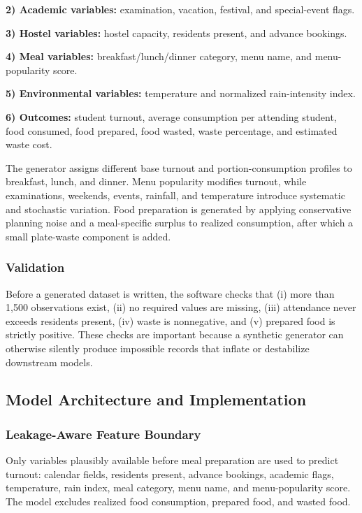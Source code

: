 \documentclass[conference]{IEEEtran}
\begin{document}
\textbf{2) Academic variables:} examination, vacation, festival, and
special-event flags.

\textbf{3) Hostel variables:} hostel capacity, residents present, and
advance bookings.

\textbf{4) Meal variables:} breakfast/lunch/dinner category, menu name,
and menu-popularity score.

\textbf{5) Environmental variables:} temperature and normalized
rain-intensity index.

\textbf{6) Outcomes:} student turnout, average consumption per attending
student, food consumed, food prepared, food wasted, waste percentage,
and estimated waste cost.

The generator assigns different base turnout and portion-consumption
profiles to breakfast, lunch, and dinner. Menu popularity modifies
turnout, while examinations, weekends, events, rainfall, and temperature
introduce systematic and stochastic variation. Food preparation is
generated by applying conservative planning noise and a meal-specific
surplus to realized consumption, after which a small plate-waste
component is added.

\subsubsection{Validation}\label{validation}

Before a generated dataset is written, the software checks that (i) more
than 1,500 observations exist, (ii) no required values are missing,
(iii) attendance never exceeds residents present, (iv) waste is
nonnegative, and (v) prepared food is strictly positive. These checks
are important because a synthetic generator can otherwise silently
produce impossible records that inflate or destabilize downstream
models.

\subsection{Model Architecture and
Implementation}\label{model-architecture-and-implementation}

\subsubsection{Leakage-Aware Feature
Boundary}\label{leakage-aware-feature-boundary}

Only variables plausibly available before meal preparation are used to
predict turnout: calendar fields, residents present, advance bookings,
academic flags, temperature, rain index, meal category, menu name, and
menu-popularity score. The model excludes realized food consumption,
prepared food, and wasted food.
\end{document}
